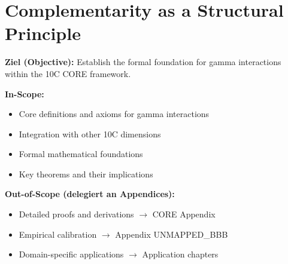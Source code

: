 %
%
%
%

\chapter{Complementarity as a Structural Principle}
\label{ch:complementarity}

\begin{tcolorbox}[
    colback=purple!5!white,
    colframe=purple!75!black,
    title={\textbf{Chapter Scope: Ziel / In-Scope / Out-of-Scope}},
    fonttitle=\bfseries
]

\textbf{Ziel (Objective):}
Establish the formal foundation for gamma interactions within the 10C CORE framework.

\vspace{0.3cm}
\textbf{In-Scope:}
\begin{itemize}[nosep]
    \item Core definitions and axioms for gamma interactions
    \item Integration with other 10C dimensions
    \item Formal mathematical foundations
    \item Key theorems and their implications
\end{itemize}

\vspace{0.3cm}
\textbf{Out-of-Scope (delegiert an Appendices):}
\begin{itemize}[nosep]
    \item Detailed proofs and derivations $\rightarrow$ CORE Appendix
    \item Empirical calibration $\rightarrow$ Appendix UNMAPPED_BBB
    \item Domain-specific applications $\rightarrow$ Application chapters
\end{itemize}

\end{tcolorbox}



